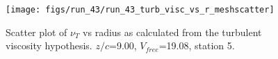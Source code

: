 \begin{figure}[H]
\centering
\texttt{[image: figs/run\_43/run\_43\_turb\_visc\_vs\_r\_meshscatter]}
\caption{Scatter plot of $\nu_T$ vs radius as calculated from the turbulent viscosity hypothesis. $z/c$=9.00, $V_{free}$=19.08, station 5.}
\label{fig:run_43_turb_visc_vs_r_meshscatter}
\end{figure}


